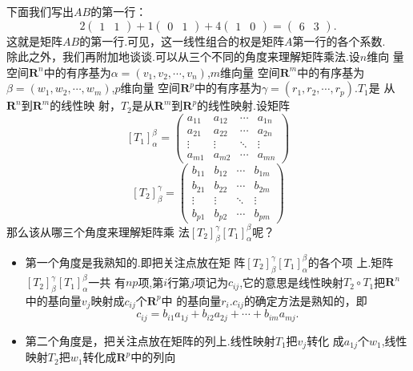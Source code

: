 ﻿\documentclass{book} \usepackage{exsheets} \usepackage{xeCJK}
\begin{document}
\begin{solution}
  下面我们写出$AB$的第一行：
$$
2
\begin{pmatrix}
  1&1
\end{pmatrix}+1
\begin{pmatrix}
  0&1
\end{pmatrix}+4
\begin{pmatrix}
  1&0
\end{pmatrix}=
\begin{pmatrix}
  6&3
\end{pmatrix}.
$$
这就是矩阵$AB$的第一行.可见，这一线性组合的权是矩阵$A$第一行的各个系数.\\

除此之外，我们再附加地谈谈.可以从三个不同的角度来理解矩阵乘法.设$n$维向
量空间$\mathbf{R}^n$中的有序基为$\alpha=(v_1,v_2,\cdots,v_n)$,$m$维向量
空间$\mathbf{R}^{m}$中的有序基为$\beta=(w_1,w_2,\cdots,w_m)$,$p$维向量
空间$\mathbf{R}^{p}$中的有序基为$\gamma=(r_1,r_2,\cdots,r_{p})$.$T_1$是
从$\mathbf{R}^n$到$\mathbf{R}^{m}$的线性映
射，$T_2$是从$\mathbf{R}^m$到$\mathbf{R}^{p}$的线性映射.设矩阵
$$
[T_1]_{\alpha}^{\beta}=
\begin{pmatrix}
  a_{11}&a_{12}&\cdots&a_{1n}\\
  a_{21}&a_{22}&\cdots&a_{2n}\\
  \vdots&\vdots&\ddots&\vdots\\
  a_{m1}&a_{m2}&\cdots&a_{mn}
\end{pmatrix}
$$
$$
[T_2]_{\beta}^{\gamma}=
\begin{pmatrix}
  b_{11}&b_{12}&\cdots&b_{1m}\\
  b_{21}&b_{22}&\cdots&b_{2m}\\
  \vdots&\vdots&\ddots&\vdots\\
  b_{p1}&b_{p2}&\cdots&b_{pm}
\end{pmatrix}
$$
那么该从哪三个角度来理解矩阵乘
法$[T_2]_{\beta}^{\gamma}[T_1]_{\alpha}^{\beta}$呢？
\begin{itemize}
\item 第一个角度是我熟知的.即把关注点放在矩
  阵$[T_2]_{\beta}^{\gamma}[T_1]_{\alpha}^{\beta}$的各个项
  上.矩阵$[T_2]_{\beta}^{\gamma}[T_1]_{\alpha}^{\beta}$一共
  有$np$项,第$i$行第$j$项记为$c_{ij}$,它的意思是线性映射$T_2\circ
  T_1$把$\mathbf{R}^n$中的基向量$v_j$映射成$c_{ij}$个$\mathbf{R}^{p}$中
  的基向量$r_i$.$c_{ij}$的确定方法是熟知的，即
$$
c_{ij}=b_{i1}a_{1j}+b_{i2}a_{2j}+\cdots+b_{im}a_{mj}.
$$
\item
  第二个角度是，把关注点放在矩阵的列上.线性映射$T_1$把$v_j$转化
  成$a_{1j}$个$w_1$,线性映射$T_2$把$w_1$转化成$\mathbf{R}^{p}$中的列向

\end{itemize}
\end{solution}
\end{document}
